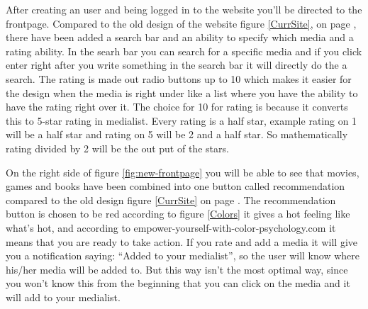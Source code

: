 After creating an user and being logged in to the website you’ll be directed to the frontpage. Compared to the old design of the website figure \ref{CurrSite}, on page \pageref{CurrSite}, there have been added a search bar and an ability to specify which media and a rating ability. In the searh bar you can search for a specific media and if you click enter right after you write something in the search bar it will directly do the a search. The rating is made out radio buttons up to 10 which makes it easier for the design when the media is right under like a list where you have the ability to have the rating right over it. The choice for 10 for rating is because it converts this to 5-star rating in medialist. Every rating is a half star, example rating on 1 will be a half star and rating on 5 will be 2 and a half star. So mathematically rating divided by 2 will be the out put of the stars.

On the right side of figure \ref{fig:new-frontpage} you will be able to see that movies, games and books have been combined into one button called recommendation compared to the old design figure \ref{CurrSite} on page \pageref{CurrSite}. The recommendation button is chosen to be red according to figure \ref{Colors} it gives a hot feeling like what’s hot, and according to empower-yourself-with-color-psychology.com it means that you are ready to take action. 
If you rate and add a media it will give you a notification saying: “Added to your medialist”, so the user will know where his/her media will be added to. But this way isn't the most optimal way, since you won't know this from the beginning that you can click on the media and it will add to your medialist.

